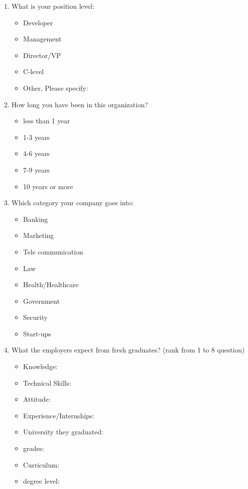 \documentclass[12pt,a4paper,titlepage]{article}
\begin{document}
\begin{enumerate}
	
	\item What is your position level:
	\begin{itemize}
		\item Developer
		\item Management
		\item Director/VP
		\item C-level
		\item Other, Please specify:
	\end{itemize}

	\item How long you have been in this organization?
	\begin{itemize}
		\item less than 1 year
		\item 1-3 years
		\item 4-6 years
		\item 7-9 years
		\item 10 years or more
	\end{itemize}

	\item Which category your company goes into:
	\begin{itemize}
		\item Banking
		\item Marketing
		\item Tele communication
		\item Law
		\item Health/Healthcare
		\item Government
		\item Security
		\item Start-ups
	\end{itemize}
	
	\item What the employers expect from fresh graduates? (rank from 1 to 8 question)
	\begin{itemize}
		\item Knowledge:
		\item Technical Skills:
		\item Attitude:
		\item Experience/Internships:
		\item University they graduated:
		\item grades:
		\item Curriculum:
		\item degree level:
	\end{itemize}


\end{enumerate}
\end{document}
